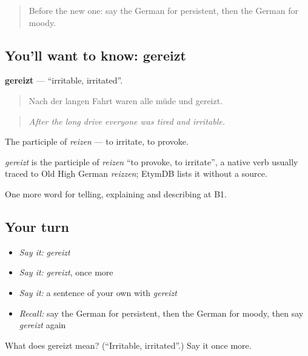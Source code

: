 \begin{quote}
Before the new one: say the German for persistent, then the German for moody.
\end{quote}

\subsection*{You'll want to know: gereizt}
\textbf{gereizt} — \textquotedblleft{}irritable, irritated\textquotedblright{}.

\begin{quote}
Nach der langen Fahrt waren alle müde und gereizt.
\end{quote}

\begin{quote}
\emph{After the long drive everyone was tired and irritable.}
\end{quote}

The participle of \emph{reizen} — to irritate, to provoke.

\begin{cousinweb}
\emph{gereizt} is the participle of \emph{reizen} \textquotedblleft{}to provoke, to irritate\textquotedblright{}, a native verb usually traced to Old High German \emph{reizzen}; EtymDB lists it without a source.
\end{cousinweb}

\begin{grammarlens}[title={What you've built}]
One more word for telling, explaining and describing at B1.
\end{grammarlens}

\subsection*{Your turn}
\begin{itemize}
\raggedright
  \item \emph{Say it:} \emph{gereizt}
  \item \emph{Say it:} \emph{gereizt}, once more
  \item \emph{Say it:} a sentence of your own with \emph{gereizt}
  \item \emph{Recall:} say the German for persistent, then the German for moody, then say \emph{gereizt} again
\end{itemize}

\begin{tcolorbox}[breakable,colback=teal!4,colframe=teal!35!black,title={Before you move on}]
What does gereizt mean? (\textquotedblleft{}Irritable, irritated\textquotedblright{}.) Say it once more.
\end{tcolorbox}
